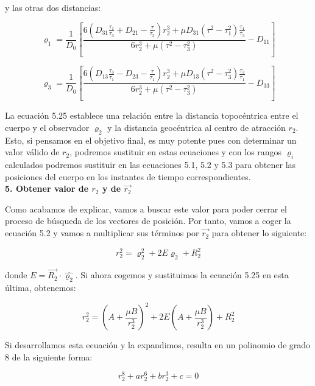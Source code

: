 \documentclass{article}
\numberwithin{equation}{section}
\begin{document}
y las otras dos distancias:

\begin{equation}
\varrho_1 = \frac{1}{D_0} \left[ \frac{6 \left( D_{31} \frac{\tau_1}{\tau_3} + D_{21} - \frac{\tau}{\tau_3} \right) r_2^3 + \mu D_{31} (\tau^2 - \tau_1^2) \frac{\tau_1}{\tau_3}}{6r_2^3 + \mu (\tau^2 - \tau_3^2)} - D_{11} \right]
\end{equation}

\begin{equation}
\varrho_3 = \frac{1}{D_0} \left[ \frac{6 \left( D_{13} \frac{\tau_3}{\tau_1} - D_{23} - \frac{\tau}{\tau_1} \right) r_2^3 + \mu D_{13} (\tau^2 - \tau_3^2) \frac{\tau_3}{\tau_1}}{6r_2^3 + \mu (\tau^2 - \tau_3^2)} - D_{33} \right]
\end{equation}

La ecuación 5.25 establece una relación entre la distancia topocéntrica entre el cuerpo y el observador $\varrho_2$ y la distancia geocéntrica al centro de atracción $r_2$. Esto, si pensamos en el objetivo final, es muy potente pues con determinar un valor válido de $r_2$, podremos sustituir en estas ecuaciones y con los rangos $\varrho_i$ calculados podremos sustituir en las ecuaciones 5.1, 5.2 y 5.3 para obtener las posiciones del cuerpo en los instantes de tiempo correspondientes.\\

\noindent\textbf{5. Obtener valor de $r_2$ y de $\overrightarrow{r_2}$}

Como acabamos de explicar, vamos a buscar este valor para poder cerrar el proceso de búsqueda de los vectores de posición. Por tanto, vamos a coger la ecuación 5.2 y vamos a multiplicar sus términos por $\overrightarrow{r_2}$ para obtener lo siguiente:

\begin{equation}
r_2^2 = \varrho_2^2 + 2E \varrho_2 + R_2^2
\end{equation}

donde $E=\overrightarrow{R_2}\cdot\hat{\varrho_2}$. Si ahora cogemos y sustituimos la ecuación 5.25 en esta última, obtenemos: 

\begin{equation}
    r_2^2 = \left( A + \frac{\mu B}{r_2^3} \right)^2 + 2E \left( A + \frac{\mu B}{r_2^3} \right) + R_2^2
\end{equation}

Si desarrollamos esta ecuación y la expandimos, resulta en un polinomio de grado 8 de la siguiente forma: 

\begin{equation}
    r_2^8 + ar_2^6 + br_2^3 + c = 0
\end{equation}
\end{document}
